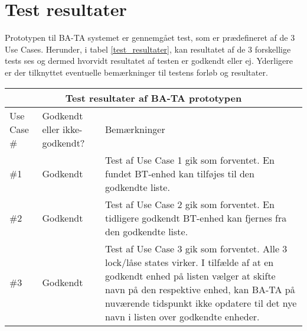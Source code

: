 \graphicspath{{Chapters/Alternative/}}


\section{Test resultater}

Prototypen til BA-TA systemet er gennemgået test, som er prædefineret af de 3 Use Cases.
Herunder, i tabel \ref{test_resultater}, kan resultatet af de 3 forskellige tests ses og dermed hvorvidt resultatet af testen er godkendt eller ej. Yderligere er der tilknyttet eventuelle bemærkninger til testens forløb og resultater.

\hfill \break
\hfill \break

\setlength{\tabcolsep}{18pt}

{
\centering
\label{test_resultater}
\begin{tabular}{ |p{4.2cm}|p{4.2cm}|p{4.2cm}|  }
		\hline
		\multicolumn{3}{|c|}{\textbf{Test resultater af BA-TA prototypen}} \\
		\hline
		Use Case \#& Godkendt eller ikke-godkendt? &Bemærkninger \\
		\hline
		\#1 & Godkendt & Test af Use Case 1 gik som forventet. En fundet BT-enhed kan tilføjes til den godkendte liste. \\
		\hline
		\#2 & Godkendt & Test af Use Case 2 gik som forventet. En tidligere godkendt BT-enhed kan fjernes fra den godkendte liste. \\
		\hline
		\#3 & Godkendt & Test af Use Case 3 gik som forventet. Alle 3 lock/låse states virker. I tilfælde af at en godkendt enhed på listen vælger at skifte navn på den respektive enhed, kan BA-TA på nuværende tidspunkt ikke opdatere til det nye navn i listen over godkendte enheder. \\
		\hline
\end{tabular}
}
